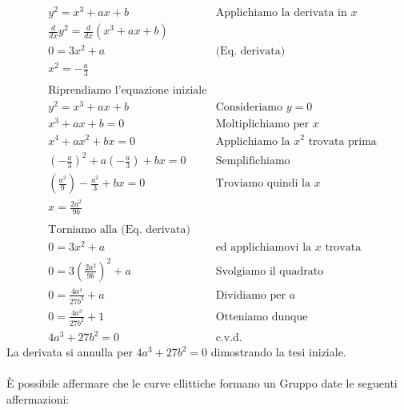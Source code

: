 \documentclass[a4paper,12pt]{tesiinfo}
\newcommand\ddfrac[2]{\frac{\displaystyle #1}{\displaystyle #2}}
\begin{document}
\begin{align*}
&y^2 = x^3 + ax+b &\text{Applichiamo la derivata in $x$}\\
&\ddfrac{d}{dx}y^2 = \ddfrac{d}{dx}(x^3 +ax+b)\\
&0 = 3x^2 +a &\text{(Eq. derivata)}\\
&x^2 = -\ddfrac{a}{3}\\
\\
&\text{Riprendiamo l'equazione iniziale}\\
&y^2 = x^3 + ax+b &\text{Consideriamo $y=0$}\\
&x^3 + ax+b = 0 &\text{Moltiplichiamo per $x$}\\
&x^4 + ax^2+bx = 0 &\text{Applichiamo la $x^2$ trovata prima}\\
& \left (-\ddfrac{a}{3} \right )^2 + a \left (-\ddfrac{a}{3}\right )+bx = 0 &\text{Semplifichiamo}\\
&\left (\ddfrac{a^2}{9} \right ) - \ddfrac{a^2}{3}+bx = 0 &\text{Troviamo quindi la $x$}\\
&x = \ddfrac{2a^2}{9b} \\
\\
&\text{Torniamo alla (Eq. derivata)}\\
&0 = 3x^2 +a &\text{ed applichiamovi la $x$ trovata}\\
&0 = 3 \left (\ddfrac{2a^2}{9b} \right )^2 +a &\text{Svolgiamo il quadrato}\\
&0 = \ddfrac{4a^4}{27b^2} +a &\text{Dividiamo per $a$}\\
&0 = \ddfrac{4a^3}{27b^2} +1 &\text{Otteniamo dunque}\\
&4a^3+27b^2 = 0 &\text{c.v.d.}
\end{align*}
La derivata si annulla per $4a^3+27b^2 = 0$ dimostrando la tesi iniziale.
\\
\\
\`E possibile affermare che le curve ellittiche formano un Gruppo date le seguenti affermazioni:
\end{document}

